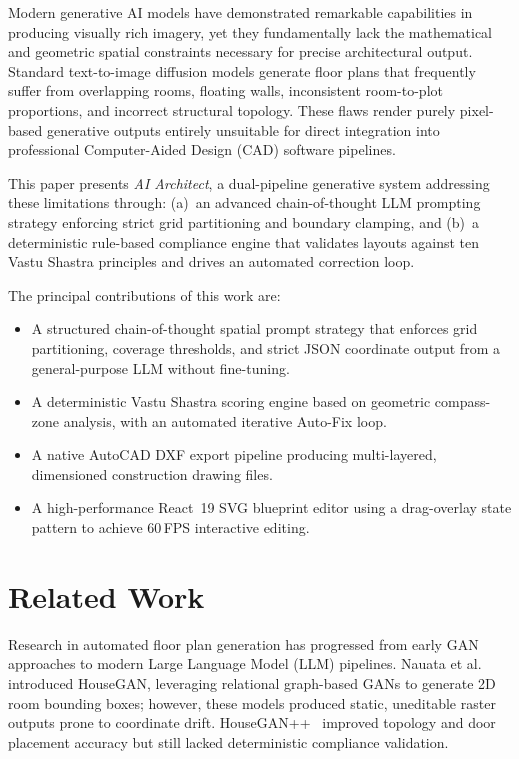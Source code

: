\documentclass[10pt, twocolumn, letterpaper]{article}
\begin{document}
Modern generative AI models have demonstrated remarkable capabilities in
producing visually rich imagery, yet they fundamentally lack the mathematical
and geometric spatial constraints necessary for precise architectural output.
Standard text-to-image diffusion models generate floor plans that frequently
suffer from overlapping rooms, floating walls, inconsistent room-to-plot
proportions, and incorrect structural topology. These flaws render purely
pixel-based generative outputs entirely unsuitable for direct integration into
professional Computer-Aided Design (CAD) software pipelines.

This paper presents \textit{AI Architect}, a dual-pipeline generative system
addressing these limitations through: (a)~an advanced chain-of-thought LLM
prompting strategy enforcing strict grid partitioning and boundary clamping,
and (b)~a deterministic rule-based compliance engine that validates layouts
against ten Vastu Shastra principles and drives an automated correction loop.

The principal contributions of this work are:
\begin{itemize}[leftmargin=*, itemsep=0pt, topsep=2pt]
  \item A structured chain-of-thought spatial prompt strategy that enforces
        grid partitioning, coverage thresholds, and strict JSON coordinate
        output from a general-purpose LLM without fine-tuning.
  \item A deterministic Vastu Shastra scoring engine based on geometric
        compass-zone analysis, with an automated iterative Auto-Fix loop.
  \item A native AutoCAD DXF export pipeline producing multi-layered,
        dimensioned construction drawing files.
  \item A high-performance React~19 SVG blueprint editor using a
        drag-overlay state pattern to achieve 60\,FPS interactive editing.
\end{itemize}

\section{Related Work}

Research in automated floor plan generation has progressed from early GAN
approaches to modern Large Language Model (LLM) pipelines. Nauata et al.~\cite{houseGAN}
introduced HouseGAN, leveraging relational graph-based GANs to generate
2D room bounding boxes; however, these models produced static, uneditable
raster outputs prone to coordinate drift. HouseGAN++~\cite{houseGANpp}
improved topology and door placement accuracy but still lacked deterministic
compliance validation.
\end{document}

